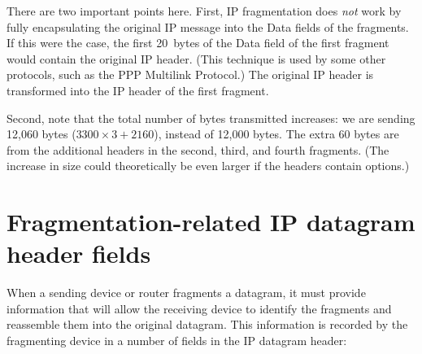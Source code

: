There are two important points here. First, IP fragmentation does \emph{not} work by fully encapsulating the original IP message into the Data fields of the fragments.
If this were the case, the first 20~bytes of the Data field of the first fragment would contain the original
IP header.
(This technique is used by some other protocols, such as the PPP Multilink Protocol.)
The original IP header is transformed into the IP header of the first fragment.

Second, note that the total number of bytes transmitted increases: we are sending 12,060 bytes ($3300\times 3 + 2160$), instead of 12,000 bytes.
The extra 60 bytes are from the additional headers in the second, third, and fourth fragments.
(The increase in size could theoretically be even larger if the headers contain options.)



\section{Fragmentation-related IP datagram header fields}

\protect\hypertarget{ch22s02.htmlux5cux23idx-CHP-22-0809}{}{}When a
sending device or router fragments a datagram, it must provide
information that will allow the receiving device to identify the
fragments and reassemble them into the original datagram. This
information is recorded by the fragmenting device in a number of fields
in the IP datagram header:

